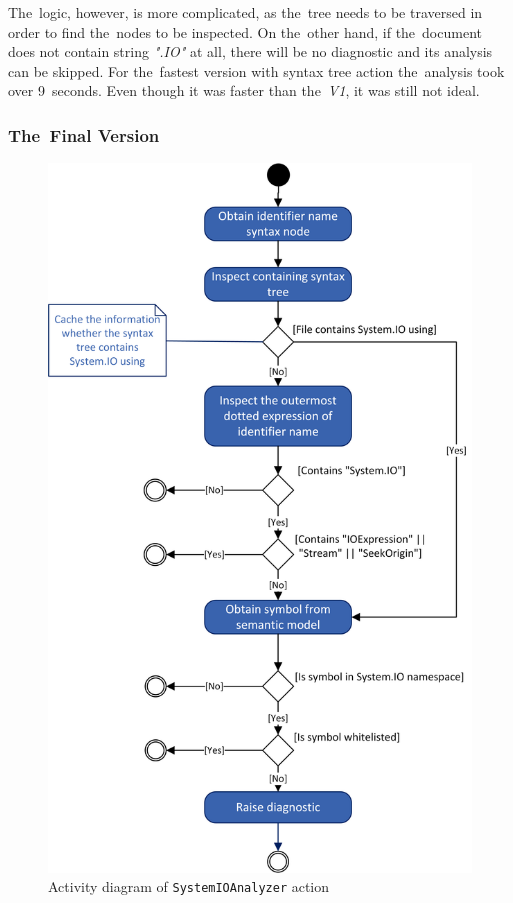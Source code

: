 \documentclass[
  digital, %
  table,   %
  lof,     %
  lot,     %
  oneside,
]{fithesis3}
\begin{document}
The~logic, however, is more complicated, as the~tree needs to be traversed in order to find the~nodes to be inspected. On the~other hand, if the~document does not contain string \textit{".IO"} at all, there will be no diagnostic and its analysis can be skipped. For the~fastest version with syntax tree action the~analysis took over 9~seconds. Even though it was faster than the~\textit{V1}, it was still not ideal.

\subsubsection{\textbf{The~Final Version}}
\begin{figure}
		\centering
			\includegraphics[scale=0.98]{img/uml/system-io-activity-diagram}
		\caption{Activity diagram of \texttt{SystemIOAnalyzer} action}
		\label{fig:uml-system-io-activity-diagram}
\end{figure}
\end{document}
